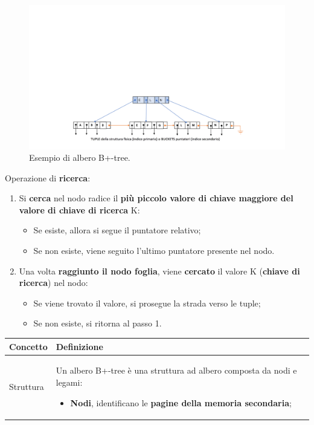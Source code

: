 \documentclass[a4paper]{article}
\begin{document}
\begin{enumerate}
		\begin{figure}[!htp]
			\centering
			\includegraphics[width=\textwidth]{img/ex/b+-tree-1.pdf}
			\caption*{Esempio di albero B+-tree.}
		\end{figure}
		
		\noindent
		Operazione di \textbf{ricerca}:
		\begin{enumerate}
			\item Si \textbf{cerca} nel nodo radice il \textbf{più piccolo valore di chiave maggiore del valore di chiave di ricerca} K:
			\begin{itemize}
				\item Se esiste, allora si segue il puntatore relativo;
				
				\item Se non esiste, viene seguito l'ultimo puntatore presente nel nodo.
			\end{itemize}
			
			\item Una volta \textbf{raggiunto il nodo foglia}, viene \textbf{cercato} il valore K (\textbf{chiave di ricerca}) nel nodo:
			\begin{itemize}
				\item Se viene trovato il valore, si prosegue la strada verso le tuple;
				
				\item Se non esiste, si ritorna al passo 1.
			\end{itemize}
		\end{enumerate}\newpage
		
		\begin{table}[!htp]
			\centering
			\begin{tabular}{@{} l p{23em} @{}}
				\toprule
				Concetto & Definizione \\
				\midrule
				Struttura 	& Un albero B+-tree è una struttura ad albero composta da nodi e legami:
				\begin{itemize}
					\item \textbf{Nodi}, identificano le \textbf{pagine della memoria secondaria};
					

\end{itemize}
\end{tabular}
\end{table}
\end{enumerate}
\end{document}
